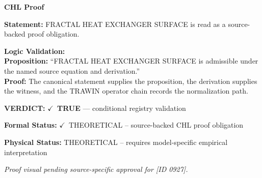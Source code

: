 \vspace{0.45em}
\noindent\textbf{CHL Proof}\par
\textbf{Statement:} FRACTAL HEAT EXCHANGER SURFACE is read as a source-backed proof obligation.

\textbf{Logic Validation:}\\
\textbf{Proposition:} ``FRACTAL HEAT EXCHANGER SURFACE is admissible under the named source equation and derivation.''\\
\textbf{Proof:} The canonical statement supplies the proposition, the derivation supplies the witness, and the TRAWIN operator chain records the normalization path.

\textbf{VERDICT:} \ensuremath{\checkmark}\ \textbf{TRUE} --- conditional registry validation

\textbf{Formal Status:} \ensuremath{\checkmark}\ THEORETICAL -- source-backed CHL proof obligation

\textbf{Physical Status:} THEORETICAL -- requires model-specific empirical interpretation
\par\vspace{0.45em}
\par
\vfill
\begingroup\footnotesize\itshape
Proof visual pending source-specific approval for [ID 0927].
\par\endgroup
\vfill
\endgroup
\endgroup
